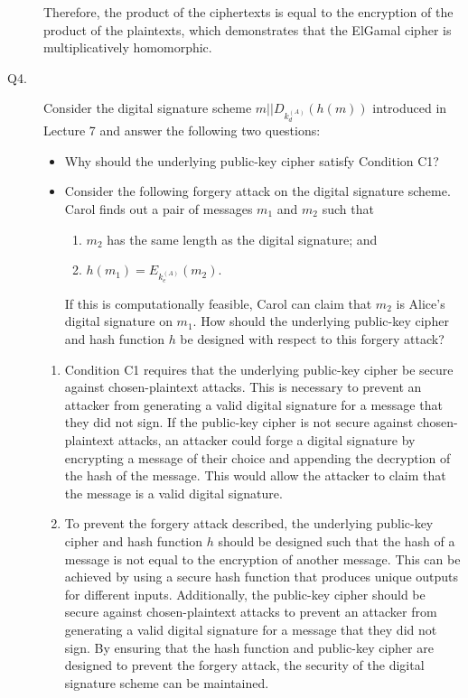 \documentclass[11pt,epsfig]{article}
\begin{document}
\begin{description}
Therefore, the product of the ciphertexts is equal to the encryption of the product of the plaintexts, which demonstrates that the ElGamal cipher is multiplicatively homomorphic.




\item[Q4.] 
Consider the digital signature scheme $m||D_{k_d^{(A)}}(h(m))$ introduced in Lecture 7 and answer the following two questions:
\begin{itemize}
\item Why should the underlying public-key cipher satisfy Condition C1? \hfill {}


\item  Consider the following forgery attack on the digital signature scheme.  
Carol finds out a pair of messages $m_1$ and 
$m_2$ such that 
\begin{enumerate}
\item $m_2$ has the same length as the digital signature; and 
\item $h(m_1)=E_{k_e^{(A)}}(m_2)$. 
\end{enumerate}
If this is computationally feasible,  Carol can claim that $m_2$ is Alice's digital signature on $m_1$. 
How should the underlying public-key cipher and hash function $h$ be designed with respect to this forgery attack?   \hfill {}
\end{itemize} 

\begin{enumerate}
\item Condition C1 requires that the underlying public-key cipher be secure against chosen-plaintext attacks. This is necessary to prevent an attacker from generating a valid digital signature for a message that they did not sign. If the public-key cipher is not secure against chosen-plaintext attacks, an attacker could forge a digital signature by encrypting a message of their choice and appending the decryption of the hash of the message. This would allow the attacker to claim that the message is a valid digital signature.
\item To prevent the forgery attack described, the underlying public-key cipher and hash function $h$ should be designed such that the hash of a message is not equal to the encryption of another message. This can be achieved by using a secure hash function that produces unique outputs for different inputs. Additionally, the public-key cipher should be secure against chosen-plaintext attacks to prevent an attacker from generating a valid digital signature for a message that they did not sign. By ensuring that the hash function and public-key cipher are designed to prevent the forgery attack, the security of the digital signature scheme can be maintained.
\end{enumerate}




\end{description}
\end{document}
